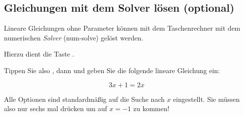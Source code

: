 
\subsection{Gleichungen mit dem Solver lösen (optional)}

Lineare Gleichungen ohne Parameter können mit dem Taschenrechner mit dem numerischen
\textit{Solver} (num-solve) gelöst werden.

  Hierzu dient die Taste .

  Tippen Sie also , dann  und geben
  Sie die folgende lineare Gleichung ein:

  $$3x+1 = 2x$$

  Alle Optionen sind standardmäßig auf die Suche nach $x$
  eingestellt. Sie müssen also nur sechs mal 
  drücken um auf $x=-1$ zu kommen!
  \newpage

  
